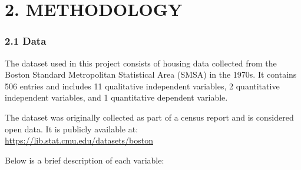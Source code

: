 \documentclass[
]{article}
\begin{document}
\hfill\break
\hfill\break
\hfill\break

\section{2. METHODOLOGY}\label{methodology}

\subsubsection{2.1 Data}\label{data}

The dataset used in this project consists of housing data collected from
the Boston Standard Metropolitan Statistical Area (SMSA) in the 1970s.
It contains 506 entries and includes 11 qualitative independent
variables, 2 quantitative independent variables, and 1 quantitative
dependent variable.

The dataset was originally collected as part of a census report and is
considered open data. It is publicly available at:\\
\url{https://lib.stat.cmu.edu/datasets/boston}

Below is a brief description of each variable:
\end{document}
